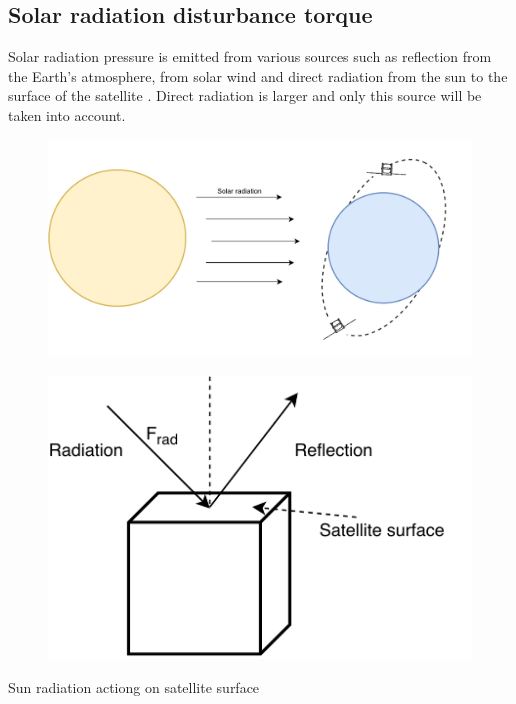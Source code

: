 \subsection*{Solar radiation disturbance torque}\label{chap: disturbances2}

Solar radiation pressure is emitted from various sources such as reflection from the Earth's atmosphere, from solar wind and direct radiation from the sun to the surface of the satellite\cite{SADC}\cite{our_report}  . Direct radiation is larger and only this source will be taken into account.

\begin{table}[H]
	\begin{minipage}[b]{0.49\linewidth}
		\centering
		\begin{figure}[H]
			\centering
			\includegraphics[width=1\linewidth]{figures/sunRAD}
		
		\end{figure}
	\end{minipage}\hfill
	\begin{minipage}[b]{0.49\linewidth}
		\centering
		\begin{figure}[H]
			\centering
			\includegraphics[width=0.55\linewidth]{figures/solarRad}
		
		\end{figure}
	\end{minipage}
	\caption{ Sun radiation actiong on satellite surface}
	\label{fig:radf}
\end{table}

